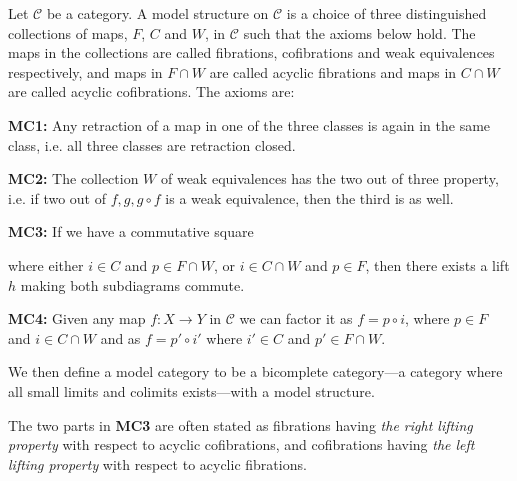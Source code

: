 \begin{definition}
\label{def:model_structure}
Let $\mathcal{C}$ be a category. A model structure on $\mathcal{C}$ is a choice of three distinguished collections of maps, $F$, $C$ and $W$, in $\mathcal{C}$
such that the axioms below hold. The maps in the collections are called fibrations, cofibrations and weak equivalences respectively, and maps in $F\cap W$ are called acyclic fibrations and maps in $C\cap W$ are called acyclic cofibrations. The axioms are:

\textbf{MC1:}
Any retraction of a map in one of the three classes is again in the same class, i.e. all three classes are retraction closed. 

\textbf{MC2:}
The collection $W$ of weak equivalences has the two out of three property, i.e. if two out of $f, g, g\circ f$ is a weak equivalence, then the third is as well.

\textbf{MC3:}
If we have a commutative square 

\begin{center}
\end{center}

where either $i\in C$ and $p\in F\cap W$, or $i\in C\cap W$ and $p\in F$, then there exists a lift $h$ making both subdiagrams commute.

\textbf{MC4:}
Given any map $f:X\longrightarrow Y$ in $\mathcal{C}$ we can factor it as $f=p\circ i$, where $p\in F$ and $i\in C\cap W$ and as $f=p'\circ i'$ where $i'\in C$ and $p'\in F\cap W$. 
\end{definition}

We then define a model category to be a bicomplete category---a category where all small limits and colimits exists---with a model structure. 

The two parts in \textbf{MC3} are often stated as fibrations having \emph{the right lifting property} with respect to acyclic cofibrations, and cofibrations having \emph{the left lifting property} with respect to acyclic fibrations. 


